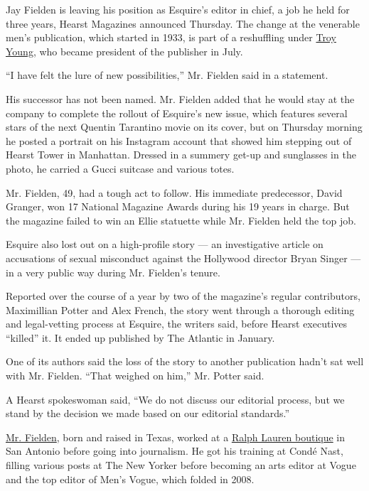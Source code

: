 Jay Fielden is leaving his position as Esquire's editor in chief, a job
he held for three years, Hearst Magazines announced Thursday. The change
at the venerable men's publication, which started in 1933, is part of a
reshuffling under
\href{https://www.nytimes3xbfgragh.onion/2020/07/22/business/media/hearst-harassment-troy-young.html}{Troy
Young}, who became president of the publisher in July.

``I have felt the lure of new possibilities,'' Mr. Fielden said in a
statement.

His successor has not been named. Mr. Fielden added that he would stay
at the company to complete the rollout of Esquire's new issue, which
features several stars of the next Quentin Tarantino movie on its cover,
but on Thursday morning he posted a portrait on his Instagram account
that showed him stepping out of Hearst Tower in Manhattan. Dressed in a
summery get-up and sunglasses in the photo, he carried a Gucci suitcase
and various totes.

Mr. Fielden, 49, had a tough act to follow. His immediate predecessor,
David Granger, won 17 National Magazine Awards during his 19 years in
charge. But the magazine failed to win an Ellie statuette while Mr.
Fielden held the top job.

Esquire also lost out on a high-profile story --- an investigative
article on accusations of sexual misconduct against the Hollywood
director Bryan Singer --- in a very public way during Mr. Fielden's
tenure.

Reported over the course of a year by two of the magazine's regular
contributors, Maximillian Potter and Alex French, the story went through
a thorough editing and legal-vetting process at Esquire, the writers
said, before Hearst executives ``killed'' it. It ended up published by
The Atlantic in January.

One of its authors said the loss of the story to another publication
hadn't sat well with Mr. Fielden. ``That weighed on him,'' Mr. Potter
said.

A Hearst spokeswoman said, ``We do not discuss our editorial process,
but we stand by the decision we made based on our editorial standards.''

\href{https://www.nytimes3xbfgragh.onion/2017/02/04/fashion/esquire-magazine-jay-fielden.html}{Mr.
Fielden}, born and raised in Texas, worked at a
\href{https://www.nytimes3xbfgragh.onion/2016/06/19/fashion/mens-style/esquire-editor-jay-fielden.html}{Ralph
Lauren boutique} in San Antonio before going into journalism. He got his
training at Condé Nast, filling various posts at The New Yorker before
becoming an arts editor at Vogue and the top editor of Men's Vogue,
which folded in 2008.

